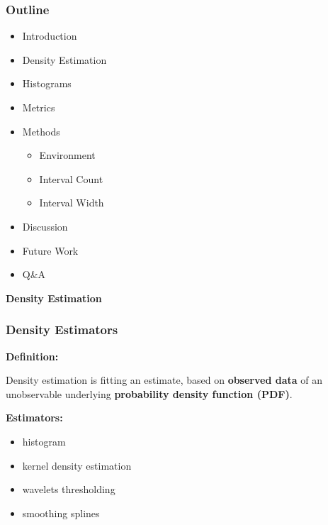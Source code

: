 \documentclass[mathserif]{beamer}
\begin{document}
    \begin{frame}
        \frametitle{Outline}

        \begin{itemize}
            \item Introduction
            \item Density Estimation
            \item Histograms
            \item Metrics
            \item Methods
            \begin{itemize}
                \item Environment
                \item Interval Count
                \item Interval Width
            \end{itemize}
            \item Discussion
            \item Future Work
            \item Q\&A
        \end{itemize}
    \end{frame}


    \begin{frame}
        \Huge \textbf{Density Estimation}
    \end{frame}


    \begin{frame}
        \frametitle{Density Estimators}

        {\Large \textbf{Definition:}}

        Density estimation is fitting an estimate, based on \textbf{observed data} of an unobservable
        underlying \textbf{probability density function (PDF)}.

        \vspace{0.3in}

        {\Large \textbf{Estimators:}}
        \begin{itemize}
            \item histogram
            \item kernel density estimation
            \item wavelets thresholding
            \item smoothing splines
        \end{itemize}
    \end{frame}
\end{document}

